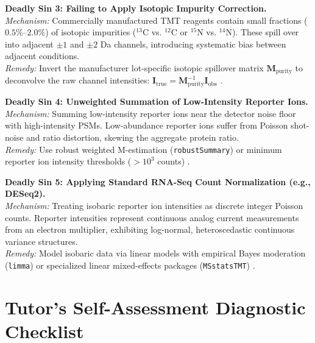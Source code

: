 \documentclass[11pt,oneside]{book}
\begin{document}
\begin{pitfallbox}
\textbf{Deadly Sin 3: Failing to Apply Isotopic Impurity Correction.}\\
\textit{Mechanism:} Commercially manufactured TMT reagents contain small fractions ($0.5\%$--$2.0\%$) of isotopic impurities ($^{13}\text{C}$ vs. $^{12}\text{C}$ or $^{15}\text{N}$ vs. $^{14}\text{N}$). These spill over into adjacent $\pm 1$ and $\pm 2$ Da channels, introducing systematic bias between adjacent conditions.\\
\textit{Remedy:} Invert the manufacturer lot-specific isotopic spillover matrix $\mathbf{M}_{\text{purity}}$ to deconvolve the raw channel intensities: $\mathbf{I}_{\text{true}} = \mathbf{M}_{\text{purity}}^{-1} \mathbf{I}_{\text{obs}}$ \cite{cox2008maxquant}.
\end{pitfallbox}

\begin{pitfallbox}
\textbf{Deadly Sin 4: Unweighted Summation of Low-Intensity Reporter Ions.}\\
\textit{Mechanism:} Summing low-intensity reporter ions near the detector noise floor with high-intensity PSMs. Low-abundance reporter ions suffer from Poisson shot-noise and ratio distortion, skewing the aggregate protein ratio.\\
\textit{Remedy:} Use robust weighted M-estimation (\texttt{robustSummary}) or minimum reporter ion intensity thresholds ($>10^3$ counts) \cite{gatto2023qfeatures}.
\end{pitfallbox}

\begin{pitfallbox}
\textbf{Deadly Sin 5: Applying Standard RNA-Seq Count Normalization (e.g., DESeq2).}\\
\textit{Mechanism:} Treating isobaric reporter ion intensities as discrete integer Poisson counts. Reporter intensities represent continuous analog current measurements from an electron multiplier, exhibiting log-normal, heteroscedastic continuous variance structures.\\
\textit{Remedy:} Model isobaric data via linear models with empirical Bayes moderation (\texttt{limma}) or specialized linear mixed-effects packages (\texttt{MSstatsTMT}) \cite{huang2020msstatstmt, smyth2004linear}.
\end{pitfallbox}

\section{Tutor's Self-Assessment Diagnostic Checklist}
\end{document}

